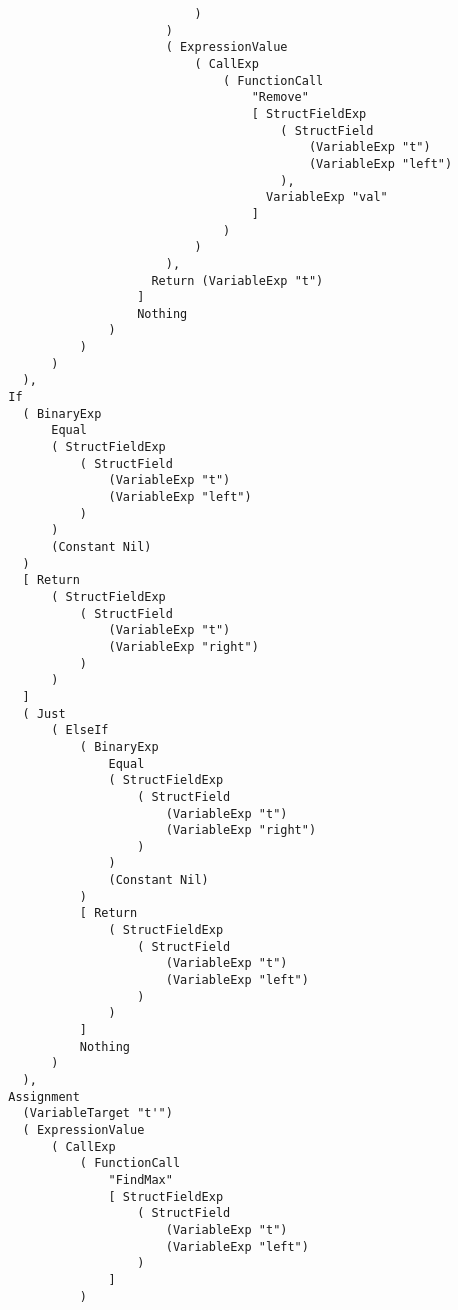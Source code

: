 \begin{lstlisting}
                                  )
                              )
                              ( ExpressionValue
                                  ( CallExp
                                      ( FunctionCall
                                          "Remove"
                                          [ StructFieldExp
                                              ( StructField
                                                  (VariableExp "t")
                                                  (VariableExp "left")
                                              ),
                                            VariableExp "val"
                                          ]
                                      )
                                  )
                              ),
                            Return (VariableExp "t")
                          ]
                          Nothing
                      )
                  )
              )
          ),
        If
          ( BinaryExp
              Equal
              ( StructFieldExp
                  ( StructField
                      (VariableExp "t")
                      (VariableExp "left")
                  )
              )
              (Constant Nil)
          )
          [ Return
              ( StructFieldExp
                  ( StructField
                      (VariableExp "t")
                      (VariableExp "right")
                  )
              )
          ]
          ( Just
              ( ElseIf
                  ( BinaryExp
                      Equal
                      ( StructFieldExp
                          ( StructField
                              (VariableExp "t")
                              (VariableExp "right")
                          )
                      )
                      (Constant Nil)
                  )
                  [ Return
                      ( StructFieldExp
                          ( StructField
                              (VariableExp "t")
                              (VariableExp "left")
                          )
                      )
                  ]
                  Nothing
              )
          ),
        Assignment
          (VariableTarget "t'")
          ( ExpressionValue
              ( CallExp
                  ( FunctionCall
                      "FindMax"
                      [ StructFieldExp
                          ( StructField
                              (VariableExp "t")
                              (VariableExp "left")
                          )
                      ]
                  )

\end{lstlisting}
